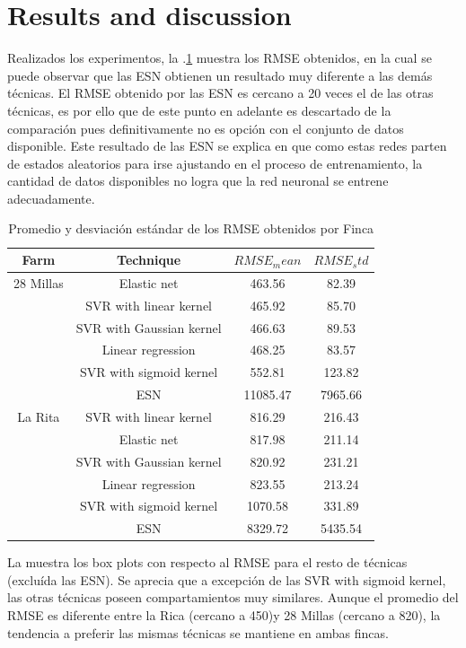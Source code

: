 \section{Results and discussion}
\label{sec:results}

Realizados los experimentos, la \tablename $.$\ref{tabla2} muestra los RMSE obtenidos, en la cual se puede observar que las ESN obtienen un resultado muy diferente a las demás técnicas. El RMSE obtenido por las ESN es cercano a 20 veces el de las otras técnicas, es por ello que de este punto en adelante es descartado de la comparación pues definitivamente no es opción con el conjunto de datos disponible. Este resultado de las ESN se explica en que como estas redes parten de estados aleatorios para irse ajustando en el proceso de entrenamiento, la cantidad de datos disponibles no logra que la red neuronal se entrene adecuadamente.
%
\begin{table}[h] 
\caption{Promedio y desviación estándar de los RMSE obtenidos por Finca} 
\label{tabla2} 
\centering
\begin{tabular}{c|c|c|c} 
\hline
\bfseries Farm & \bfseries Technique & \bfseries $RMSE_mean$ & \bfseries $RMSE_std$\\ 
\hline\hline 
28 Millas  	& Elastic net  & 463.56	& 	82.39  \\
			& SVR with linear kernel  & 465.92  & 85.70  \\
			& SVR with Gaussian kernel  & 466.63 & 89.53  \\						
			& Linear regression  & 468.25 & 83.57  \\									
			& SVR with sigmoid kernel & 552.81 & 123.82  \\									
			& ESN  & 11085.47 &  7965.66 \\												
\hline 
La Rita  	& SVR with linear kernel  & 816.29	& 	216.43  \\
			& Elastic net   &  817.98 &  211.14 \\
			& SVR with Gaussian kernel  & 820.92 & 231.21  \\						
			& Linear regression  & 823.55 &  213.24 \\									
			& SVR with sigmoid kernel & 1070.58 &  331.89 \\									
			& ESN  & 8329.72 & 5435.54  \\												
\hline    
\end{tabular} 
\end{table}
%
La  muestra los box plots con respecto al RMSE para el resto de técnicas (excluída las ESN). Se aprecia que a excepción de las SVR with sigmoid kernel, las otras técnicas poseen compartamientos muy similares. Aunque el promedio del RMSE es diferente entre la Rica (cercano a 450)y 28 Millas (cercano a 820), la tendencia a preferir las mismas técnicas se mantiene en ambas fincas.
